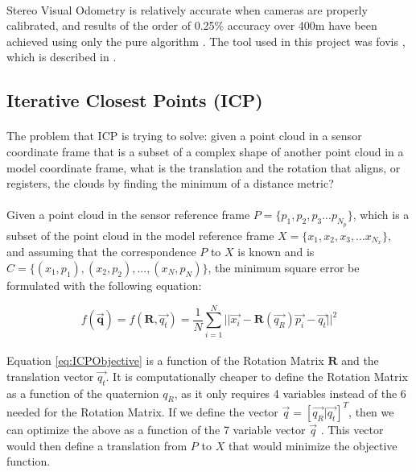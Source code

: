 \documentclass[11pt]{article}
\begin{document}
	\paragraph{}
	Stereo Visual Odometry is relatively accurate when cameras are properly calibrated, and results of the order of 0.25\% accuracy over 400m have been achieved using only the pure algorithm \cite{StereoVis1}. The tool used in this project was fovis \cite{fovis}, which is described in \cite{VisualOdometry}.
	
	\subsection{Iterative Closest Points (ICP)}
	\paragraph{}
	The problem that ICP is trying to solve: given a point cloud in a sensor coordinate frame that is a subset of a complex shape of another point cloud in a model coordinate frame, what is the translation and the rotation that aligns, or registers, the clouds by finding the minimum of a distance metric?
	
	\paragraph{}
	Given a point cloud in the sensor reference frame $P = \{p_1, p_2, p_3 ... p_{N_p}\}$, which is a subset of the point cloud in the model reference frame $X = \{x_1, x_2, x_3, ... x_{N_x}\}$, and assuming that the correspondence $P$ to $X$ is known and is $C = \{(x_1,p_1), (x_2,p_2), ... , (x_N, p_N)\}$, the minimum square error be formulated with the following equation:
	
	\begin{equation}
	f(\mathbf{\overrightarrow{q}}) = f(\mathbf{R},\overrightarrow{q_t}) = \frac{1}{N}\sum_{i=1}^{N}{||\overrightarrow{x_i}-\mathbf{R}(\overrightarrow{q_R})\overrightarrow{p_i}-\overrightarrow{q_t}||^{2}} 	
	\label{eq:ICPObjective}
	\end{equation}		
	
	\paragraph{}
	Equation \ref{eq:ICPObjective} is a function of the Rotation Matrix $\mathbf{R}$ and the translation vector $\overrightarrow{q_t}$. It is computationally cheaper to define the Rotation Matrix as a function of the quaternion $q_R$, as it only requires 4 variables instead of the 6 needed for the Rotation Matrix. If we define the vector $\overrightarrow{q} = [\overrightarrow{q_R} | \overrightarrow{q_t}]^T$, then we can optimize the above as a function of the 7 variable vector $\overrightarrow{q}$ \cite{AMethodRegistration}. This vector would then define a translation from $P$ to $X$ that would minimize the objective function.
	
\end{document}
